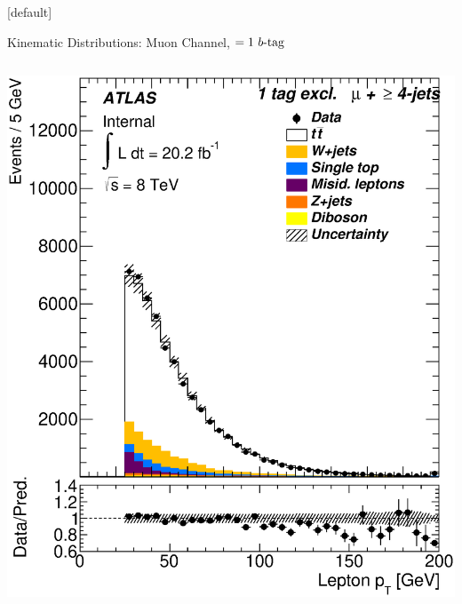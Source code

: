 \documentclass{beamer}
\begin{document}
{  \makeatletter %
  [default]
  \def\beamer@entrycode{\vspace*{-1.075\headheight}}
  \begin{frame}{Kinematic Distributions: Muon Channel, $=1\text{ } \lowercase{ b\text{-tag}}$}
    \vspace{5pt}
    \begin{columns}
      \includegraphics[width=.95\textwidth]{../chapters/whel/figures/control_Plots2/bTag_1excl/LeptonPt_mu}\\

\end{columns}
\end{frame}}
\end{document}
